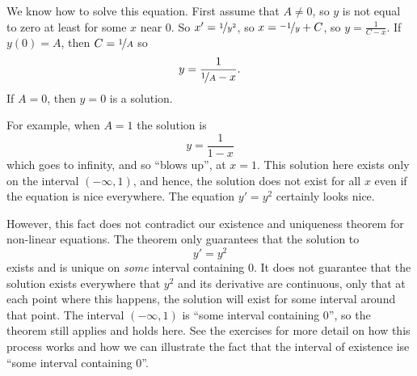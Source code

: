 \documentclass{ximera}
\begin{document}
\begin{exampleSol}
    We know how to solve this equation.  First assume that $A \not= 0$, so $y$ is not equal to zero at least for some $x$ near 0.  So $x' = \nicefrac{1}{y^2}$, so $x = \nicefrac{-1}{y} + C$, so $y = \frac{1}{C-x}$.  If $y(0) = A$, then $C = \nicefrac{1}{A}$ so
    \begin{equation*}
        y = \frac{1}{\nicefrac{1}{A} - x} .
    \end{equation*}
    If $A=0$, then $y=0$ is a solution.
    
    For example, when $A=1$ the solution is 
    \begin{equation*} 
        y = \frac{1}{1-x}
    \end{equation*}
    which goes to infinity, and so ``blows up'', at $x=1$. This solution here exists only on the interval $(-\infty, 1)$, and hence, the solution does not exist for all $x$ even if the equation is nice everywhere.  The equation $y' = y^2$ certainly looks nice. 
    
    However, this fact does not contradict our existence and uniqueness theorem for non-linear equations. The theorem only guarantees that the solution to 
    \begin{equation*} 
        y' = y^2
    \end{equation*}
    exists and is unique on \emph{some} interval containing 0. It does not guarantee that the solution exists everywhere that $y^2$ and its derivative are continuous, only that at each point where this happens, the solution will exist for some interval around that point. The interval $(-\infty, 1)$ is ``some interval containing 0'', so the theorem still applies and holds here. See the exercises for more detail on how this process works and how we can illustrate the fact that the interval of existence ise ``some interval containing 0''. 
\end{exampleSol}
\end{document}

